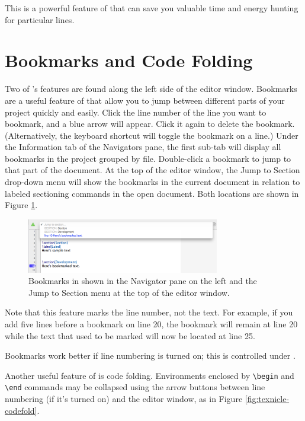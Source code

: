 This is a powerful feature of \texnicle that can save you valuable time and energy hunting for particular lines.

\section{Bookmarks and Code Folding}
\label{reference.bookmarksfolding}
Two of \texnicle's features are found along the left side of the editor window. Bookmarks are a useful feature of \texnicle that allow you to jump between different parts of your project quickly and easily. Click the line number of the line you want to bookmark, and a blue arrow will appear. Click it again to delete the bookmark. (Alternatively, the keyboard shortcut  will toggle the bookmark on a line.) Under the Information tab of the Navigators pane, the first sub-tab will display all bookmarks in the project grouped by file. Double-click a bookmark to jump to that part of the document. At the top of the editor window, the Jump to Section drop-down menu will show the bookmarks in the current document in relation to labeled sectioning commands in the open document. Both locations are shown in Figure \ref{fig:texnicle-bookmarks}.
\begin{figure}[htbp]
\centering
\includegraphics[width=0.75\textwidth]{TeXnicle-Images/texnicle-bookmarks.png}
\caption{Bookmarks in \texnicle shown in the Navigator pane on the left and the Jump to Section menu at the top of the editor window.}
\label{fig:texnicle-bookmarks}
\end{figure}

Note that this feature marks the line number, not the text. For example, if you add five lines before a bookmark on line 20, the bookmark will remain at line 20 while the text that used to be marked will now be located at line 25.

Bookmarks work better if line numbering is turned on; this is controlled under .

Another useful feature of \texnicle is code folding. Environments enclosed by \verb|\begin| and \verb|\end| commands may be collapsed using the arrow buttons between line numbering (if it's turned on) and the editor window, as in Figure \ref{fig:texnicle-codefold}.

